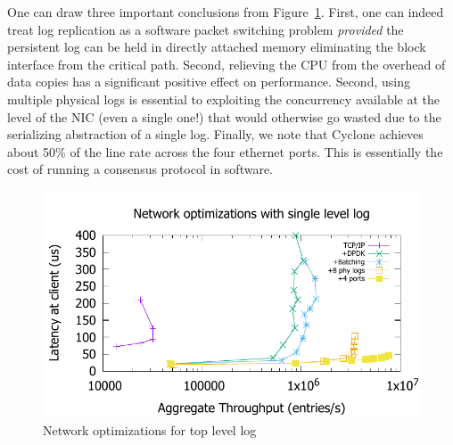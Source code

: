 \documentclass[letterpaper,twocolumn,10pt]{article}
\begin{document}
One can draw three important conclusions from
Figure~\ref{fig:network_opts}. First, one can indeed treat log
replication as a software packet switching problem \emph{provided} the
persistent log can be held in directly attached memory eliminating the
block interface from the critical path. Second, relieving the CPU from
the overhead of data copies has a significant positive effect on
performance. Second, using multiple physical logs is essential to
exploiting the concurrency available at the level of the NIC (even a
single one!) that would otherwise go wasted due to the serializing
abstraction of a single log. Finally, we note that Cyclone achieves
about 50\% of the line rate across the four ethernet ports. This is
essentially the cost of running a consensus protocol in software.

\begin{figure}
\includegraphics[scale=0.6]{results2/network_opts.pdf}
\caption{Network optimizations for top level log}
\label{fig:network_opts}
\end{figure}
\end{document}
